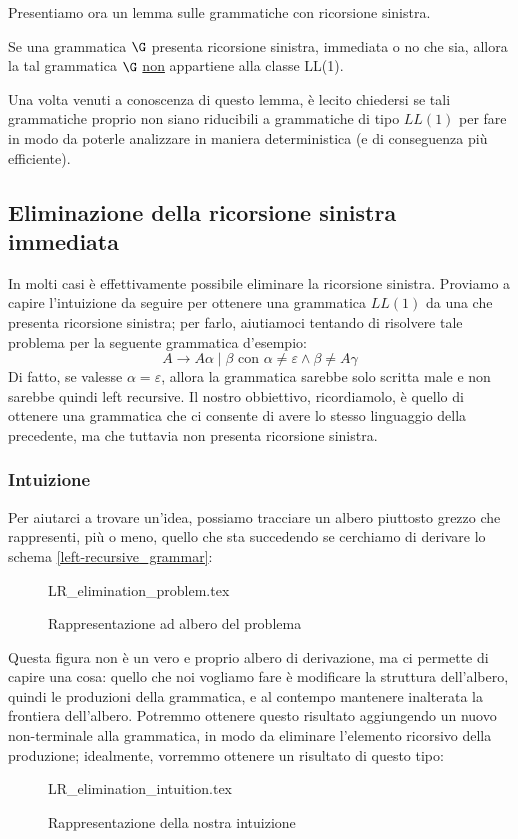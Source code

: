 \documentclass[class=book, crop=false, oneside, 12pt]{standalone}
\begin{document}
Presentiamo ora un lemma sulle grammatiche con ricorsione sinistra.
\begin{lemma}\label{ll1-leftrec}
    Se una grammatica \(\G\) presenta ricorsione sinistra, immediata o no che sia, allora la tal grammatica \(\G\) \underline{non} appartiene alla classe LL(1).
\end{lemma}
Una volta venuti a conoscenza di questo lemma, è lecito chiedersi se tali grammatiche proprio non siano riducibili a grammatiche di tipo \(LL(1)\) per fare in modo da poterle analizzare in maniera deterministica (e di conseguenza più efficiente).

\subsection{Eliminazione della ricorsione sinistra immediata}
In molti casi è effettivamente possibile eliminare la ricorsione sinistra. 
Proviamo a capire l'intuizione da seguire per ottenere una grammatica \(LL(1)\) da una che presenta ricorsione sinistra; per farlo, aiutiamoci tentando di risolvere tale problema per la seguente grammatica d'esempio:
\begin{equation}
    \label{left-recursive_grammar}
    A \to A \alpha \mid \beta \textrm{  con  } \alpha \neq \varepsilon \land \beta \neq A \gamma
\end{equation}
Di fatto, se valesse \(\alpha = \varepsilon\), allora la grammatica sarebbe solo scritta male e non sarebbe quindi left recursive. Il nostro obbiettivo, ricordiamolo, è quello di ottenere una grammatica che ci consente di avere lo stesso linguaggio della precedente, ma che tuttavia non presenta ricorsione sinistra. 

\subsubsection{Intuizione}
Per aiutarci a trovare un'idea, possiamo tracciare un albero piuttosto grezzo che rappresenti, più o meno, quello che sta succedendo se cerchiamo di derivare lo schema \ref{left-recursive_grammar}:
\begin{figure}[H]
    \centering
    {LR_elimination_problem.tex}
    \caption{Rappresentazione ad albero del problema}
    \label{lrremove-intuition_1}
\end{figure}
Questa figura non è un vero e proprio albero di derivazione, ma ci permette di capire una cosa: quello che noi vogliamo fare è modificare la struttura dell'albero, quindi le produzioni della grammatica, e al contempo mantenere inalterata la frontiera dell'albero. Potremmo ottenere questo risultato aggiungendo un nuovo non-terminale alla grammatica, in modo da eliminare l'elemento ricorsivo della produzione; idealmente, vorremmo ottenere un risultato di questo tipo:
\begin{figure}[H]
    \centering
    {LR_elimination_intuition.tex}
    \caption{Rappresentazione della nostra intuizione}
    \label{lrremove-intuition_2}
\end{figure}
\end{document}
